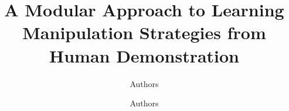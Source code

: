 

\documentclass[twocolumn]{svjour3}          %
%
\smartqed  %
%
\usepackage{amssymb}
\usepackage{caption}
\usepackage{slashbox}
\usepackage{graphics} %
\usepackage{epsfig} %
\usepackage{epstopdf}
\usepackage{subfig}
\usepackage{mathptmx} %
\usepackage{amsmath} %
\usepackage{amsmath}
\usepackage{array}
\usepackage{bm}
\usepackage{multirow}
\usepackage[usenames,dvipsnames,svgnames,table]{xcolor}
\usepackage{pbox}
\usepackage{hyperref}
\usepackage{algorithm}
\usepackage{algpseudocode}
\usepackage{natbib}


\sloppy

\title{A Modular Approach to Learning Manipulation Strategies from
  Human Demonstration}\thanks{Aude, do we need to acknowledge a funder?}

\author{Authors        \and
        Authors %
}

